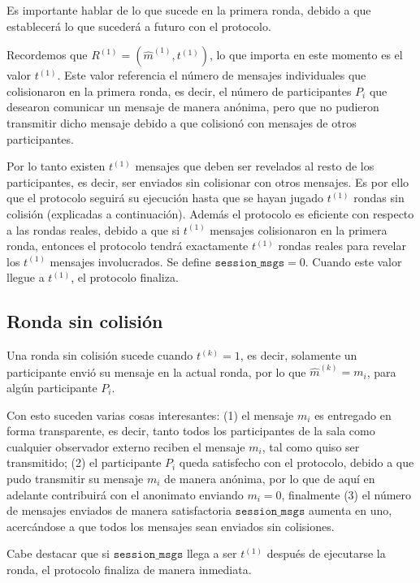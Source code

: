 Es importante hablar de lo que sucede en la primera ronda, debido a que establecerá lo 
que sucederá a futuro con el protocolo.

Recordemos que $R^{(1)} = (\hat{m}^{(1)}, t^{(1)})$, lo que importa en este momento es 
el valor $t^{(1)}$. Este valor referencia el número de mensajes individuales que 
colisionaron en la primera ronda, es decir, el número de participantes $P_i$ que desearon 
comunicar un mensaje de manera anónima, pero que no pudieron transmitir dicho mensaje 
debido a que colisionó con mensajes de otros participantes.

Por lo tanto existen $t^{(1)}$ mensajes que deben ser revelados al resto de los 
participantes, es decir, ser enviados sin colisionar con otros mensajes. Es por ello que 
el protocolo seguirá su ejecución hasta que se hayan jugado $t^{(1)}$ rondas sin colisión 
(explicadas a continuación). Además el protocolo es eficiente con respecto a las rondas 
reales, debido a que si $t^{(1)}$ mensajes colisionaron en la primera ronda, entonces el 
protocolo tendrá exactamente $t^{(1)}$ rondas reales para revelar los $t^{(1)}$ mensajes 
involucrados. Se define $\mathtt{session\_msgs} = 0$. Cuando este valor llegue a $t^{(1)}$, 
el protocolo finaliza.

\subsection{Ronda sin colisión}

Una ronda sin colisión sucede cuando $t^{(k)} = 1$, es decir, solamente un participante 
envió su mensaje en la actual ronda, por lo que $\hat{m}^{(k)} = m_i$, para algún 
participante $P_i$.

Con esto suceden varias cosas interesantes: (1) el mensaje $m_i$ es entregado en forma 
transparente, es decir, tanto todos los participantes de la sala como cualquier observador 
externo reciben el mensaje $m_i$, tal como quiso ser transmitido; (2) el participante $P_i$ 
queda satisfecho con el protocolo, debido a que pudo transmitir su mensaje $m_i$ de manera 
anónima, por lo que de aquí en adelante contribuirá con el anonimato enviando $m_i = 0$, 
finalmente (3) el número de mensajes enviados de manera satisfactoria $\mathtt{session\_msgs}$ 
aumenta en uno, acercándose a que todos los mensajes sean enviados sin colisiones.

Cabe destacar que si $\mathtt{session\_msgs}$ llega a ser $t^{(1)}$ después de ejecutarse 
la ronda, el protocolo finaliza de manera inmediata.

